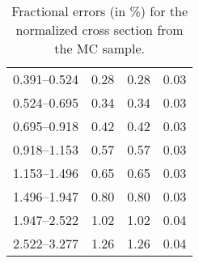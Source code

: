 \begin{table}
\begin{center}
\begin{tabular}{@{}l l l l@{}}
            0.391--0.524 & 0.28 & 0.28 & 0.03  \\
            0.524--0.695 & 0.34 & 0.34 & 0.03  \\
            0.695--0.918 & 0.42 & 0.42 & 0.03  \\
            0.918--1.153 & 0.57 & 0.57 & 0.03  \\
            1.153--1.496 & 0.65 & 0.65 & 0.03  \\
            1.496--1.947 & 0.80 & 0.80 & 0.03  \\
            1.947--2.522 & 1.02 & 1.02 & 0.04  \\
            2.522--3.277 & 1.26 & 1.26 & 0.04  \\
            \bottomrule
        \end{tabular}
    \end{center}
    \caption[
        Fractional errors for the normalized cross section from the
        \MADGRAPH MC sample.
    ]{
        Fractional errors (in \%) for the normalized cross section from the
        \MADGRAPH MC sample.
    }
    \label{tab:madgraph_uncert_norm}
\end{table}
